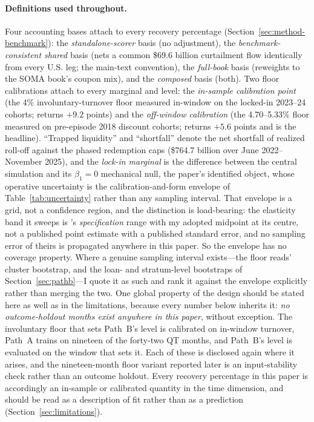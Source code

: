 \documentclass[12pt]{article}
\begin{document}
\paragraph{Definitions used throughout.} Four accounting bases attach to every recovery percentage (Section~\ref{sec:method-benchmark}): the \emph{standalone-scorer} basis (no adjustment), the \emph{benchmark-consistent shared} basis (nets a common \$69.6 billion curtailment flow identically from every U.S. leg; the main-text convention), the \emph{full-book} basis (reweights to the SOMA book's coupon mix), and the \emph{composed} basis (both). Two floor calibrations attach to every marginal and level: the \emph{in-sample calibration point} (the 4\% involuntary-turnover floor measured in-window on the locked-in 2023--24 cohorts; returns $+9.2$ points) and the \emph{off-window calibration} (the 4.70--5.33\% floor measured on pre-episode 2018 discount cohorts; returns $+5.6$ points and is the headline). ``Trapped liquidity'' and ``shortfall'' denote the net shortfall of realized roll-off against the phased redemption caps (\$764.7 billion over June 2022--November 2025), and the \emph{lock-in marginal} is the difference between the central simulation and its $\beta_1 = 0$ mechanical null, the paper's identified object, whose operative uncertainty is the calibration-and-form envelope of Table~\ref{tab:uncertainty} rather than any sampling interval. That envelope is a grid, not a confidence region, and the distinction is load-bearing: the elasticity band it sweeps is \citeauthor{liebersohn2024}'s \emph{specification} range with my adopted midpoint at its centre, not a published point estimate with a published standard error, and no sampling error of theirs is propagated anywhere in this paper. So the envelope has no coverage property. Where a genuine sampling interval exists---the floor reads' cluster bootstrap, and the loan- and stratum-level bootstraps of Section~\ref{sec:pathb}---I quote it as such and rank it against the envelope explicitly rather than merging the two. One global property of the design should be stated here as well as in the limitations, because every number below inherits it: \emph{no outcome-holdout months exist anywhere in this paper}, without exception. The involuntary floor that sets Path~B's level is calibrated on in-window turnover, Path~A trains on nineteen of the forty-two QT months, and Path~B's level is evaluated on the window that sets it. Each of these is disclosed again where it arises, and the nineteen-month floor variant reported later is an input-stability check rather than an outcome holdout. Every recovery percentage in this paper is accordingly an in-sample or calibrated quantity in the time dimension, and should be read as a description of fit rather than as a prediction (Section~\ref{sec:limitations}).
\end{document}
